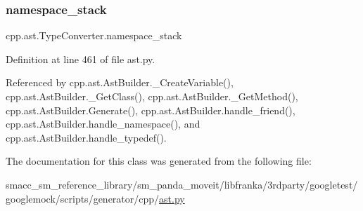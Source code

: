 \subsubsection{\texorpdfstring{namespace\+\_\+stack}{namespace\_stack}}
{\footnotesize\ttfamily cpp.\+ast.\+Type\+Converter.\+namespace\+\_\+stack}



Definition at line 461 of file ast.\+py.



Referenced by cpp.\+ast.\+Ast\+Builder.\+\_\+\+Create\+Variable(), cpp.\+ast.\+Ast\+Builder.\+\_\+\+Get\+Class(), cpp.\+ast.\+Ast\+Builder.\+\_\+\+Get\+Method(), cpp.\+ast.\+Ast\+Builder.\+Generate(), cpp.\+ast.\+Ast\+Builder.\+handle\+\_\+friend(), cpp.\+ast.\+Ast\+Builder.\+handle\+\_\+namespace(), and cpp.\+ast.\+Ast\+Builder.\+handle\+\_\+typedef().



The documentation for this class was generated from the following file\+:\begin{DoxyCompactItemize}
\item 
smacc\+\_\+sm\+\_\+reference\+\_\+library/sm\+\_\+panda\+\_\+moveit/libfranka/3rdparty/googletest/googlemock/scripts/generator/cpp/\hyperlink{ast_8py}{ast.\+py}\end{DoxyCompactItemize}

